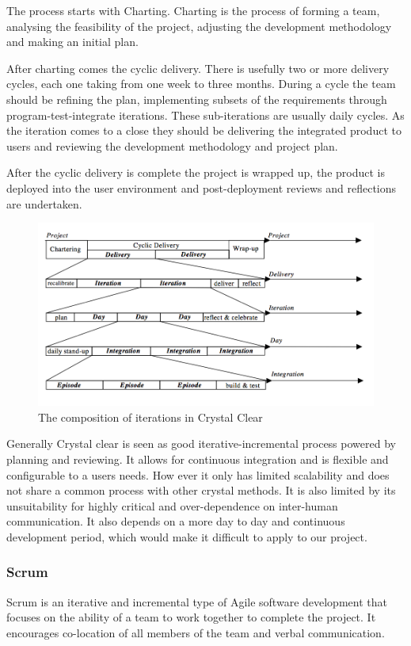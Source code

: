 \documentclass[11pt,a4paper]{article}
\begin{document}
The process starts with Charting. Charting is the process of forming a team, analysing the feasibility of the project, adjusting the development methodology and making an initial plan. 

After charting comes the cyclic delivery. There is usefully two or more delivery cycles, each one taking from one week to three months. During a cycle the team should be refining the plan, implementing subsets of the requirements through program-test-integrate iterations. These sub-iterations are usually daily cycles. As the iteration comes to a close they should be delivering the integrated product to users and reviewing the development methodology and project plan.

After the cyclic delivery is complete the project is wrapped up, the product is deployed into the user environment and post-deployment reviews and reflections are undertaken. 

\begin{figure}[H]
\centering
\includegraphics[width = 140mm]{clear.png}
\caption{The composition of iterations in Crystal Clear ~\cite{Cockburn}}
\label{fig:clear}
\end{figure}

Generally Crystal clear is seen as good iterative-incremental process powered by planning and reviewing. It allows for continuous integration and is flexible and configurable to a users needs. How ever it only has limited scalability and does not share a common process with other crystal methods. It is also limited by its unsuitability for highly critical and over-dependence on inter-human communication. It also depends on a more day to day and continuous development period, which would make it difficult to apply to our project. 

\subsubsection{Scrum}
Scrum is an iterative and incremental type of Agile software development that focuses on the ability of a team to work together to complete the project. It encourages co-location of all members of the team and verbal communication. 
\end{document}
